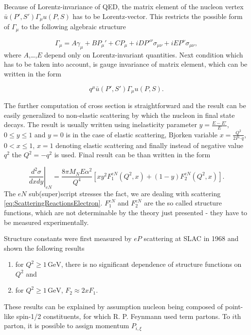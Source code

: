\documentclass[a4paper,11pt]{report}
\newcommand{\GeV}{\,\text{GeV}}
\begin{document}
Because of Lorentz-invariance of QED, the matrix element of the nucleon vertex
$\bar{u}(P',S')\Gamma_\mu u(P,S)$ has to be Lorentz-vector. This restricts
the possible form of $\Gamma_\mu$ to the following algebraic structure

\begin{equation}
  \Gamma_\mu = A \gamma_\mu + B P_\mu' + C P_\mu + i D P'^\nu \sigma_{\mu\nu}
    + i E P^\nu \sigma_{\mu\nu},
  \label{eq:ScatteringAlgebraicMatrix}
\end{equation}
where $A$,\dots,$E$ depend only on Lorentz-invariant quantities. Next condition
which has to be taken into account, is gauge invariance of matrix element, which
can be written in the form

\begin{equation}
  q^\mu \bar{u}(P',S')\Gamma_\mu u(P,S).
  \label{eq:ScatteringGaugeInvariance}
\end{equation}

The further computation of cross section is straightforward and the result can
be easily generalized to non-elastic scattering by which the nucleon in final
state decays. The result is usually written using inelasticity parameter
$y=\frac{E-E'}{E}$, $0 \leq y \leq 1$ and $y=0$ is in the case of elastic
scattering, Bjorken variable $ x = \frac{Q^2}{2 P \cdot q}$, $ 0 < x \leq 1$, $x
= 1$ denoting elastic scattering and finally instead of negative value $q^2$ the
$Q^2 = -q^2$ is used. Final result can be than written in the form

\begin{equation}
  \left. \frac{d^2\sigma}{dxdy} \right|_{eN} =
  \frac{8 \pi M_N E \alpha^2}{Q^4} \left[ x y^2 F_1^{eN}(Q^2, x)
  + (1-y) F_2^{eN}(Q^2,x) \right].
  \label{eq:ScatteringRes1}
\end{equation}
The $eN$ sub(super)script stresses the fact, we are dealing with scattering
\eqref{eq:ScatteringReactionsElectron}. $F_1^{eN}$ and $F_2^{eN}$ are the so
called structure functions, which are not determinable by the theory just
presented - they have to be measured experimentally.

Structure constants were first measured by $eP$ scattering at SLAC in 1968
\cite{ePScattering} and shown the following results
\begin{enumerate}
  \item for $Q^2 \geq 1\GeV$, there is no significant dependence of structure
    functions on $Q^2$ and
  \item for $Q^2 \geq 1\GeV$, $F_2 \approx 2xF_1$.
\end{enumerate}
These results can be explained by assumption nucleon being composed of
point-like spin-1/2 constituents, for which R. P. Feynmann used term partons. To
$i$th parton, it is possible to assign momentum $P_{i,\xi}$
\end{document}
